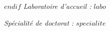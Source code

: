 \documentclass[a4paper,12pt]{reedthesis}
\begin{document}
\begin{center}
\vspace*{0.2cm}
$endif$
{\small \it Laboratoire d'accueil : }
$labo$
\vspace*{0.2cm}
\end{center}




\begin{center}
{\it Spécialité de doctorat : }
{\large $specialite$}
\end{center}
\end{document}
